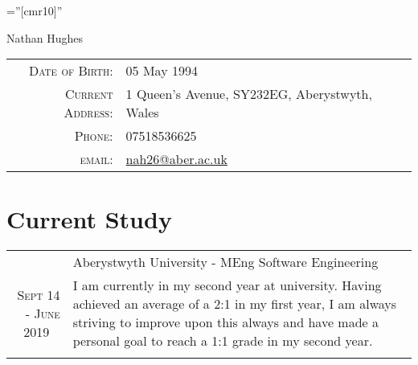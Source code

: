 \documentclass[a4paper,10pt]{article}
\begin{document}
\pagestyle{empty} %

\font\fb=''[cmr10]'' %

\par{\centering
		{\Huge Nathan {Hughes}
	}\bigskip\par}


\begin{center}
	\begin{tabular}{rl}
		\textsc{Date of Birth:} & 05 		May 1994 \\
		\textsc{Current Address:}   & 1 Queen's Avenue, SY232EG, Aberystwyth, 			Wales \\
		\textsc{Phone:}     & 07518536625\\
		\textsc{email:}     & \href{mailto:nah26@aber.ac.uk}{nah26@aber.ac.uk}
	\end{tabular}
\end{center}




\section{Current Study}


\begin{tabular}{rp{11cm}}
 &Aberystwyth University - MEng Software Engineering\\\textsc{Sept 14 - June 2019 \  }&\footnotesize{I am currently in my second year at university. Having achieved an average of a 2:1 in my first year, I am always striving to improve upon this always and have made a personal goal to reach a 1:1 grade in my second year.}\\\multicolumn{2}{c}{} \\
 


\end{tabular}
\end{document}
